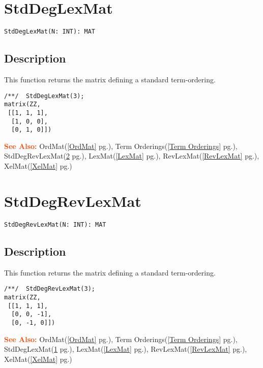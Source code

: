 \documentclass[a4paper]{mybook}
\newenvironment{command}{}{} %
\newcommand\SeeAlso{\par\textcolor{OrangeRed}{\textbf{\large See Also: }}}
\begin{document}
\section{StdDegLexMat}
\label{StdDegLexMat}
\begin{command} %


\begin{Verbatim}[label=syntax, rulecolor=\color{MidnightBlue},
frame=single]
StdDegLexMat(N: INT): MAT
\end{Verbatim}


\subsection*{Description}

This function returns the matrix defining a standard term-ordering.
\begin{Verbatim}[label=example, rulecolor=\color{PineGreen}, frame=single]
/**/  StdDegLexMat(3);
matrix(ZZ,
 [[1, 1, 1],
  [1, 0, 0],
  [0, 1, 0]])
\end{Verbatim}


\SeeAlso %
  OrdMat(\ref{OrdMat} pg.\pageref{OrdMat}), 
    Term Orderings(\ref{Term Orderings} pg.\pageref{Term Orderings}), 
    StdDegRevLexMat(\ref{StdDegRevLexMat} pg.\pageref{StdDegRevLexMat}), 
    LexMat(\ref{LexMat} pg.\pageref{LexMat}), 
    RevLexMat(\ref{RevLexMat} pg.\pageref{RevLexMat}), 
    XelMat(\ref{XelMat} pg.\pageref{XelMat})
\end{command} %

\section{StdDegRevLexMat}
\label{StdDegRevLexMat}
\begin{command} %


\begin{Verbatim}[label=syntax, rulecolor=\color{MidnightBlue},
frame=single]
StdDegRevLexMat(N: INT): MAT
\end{Verbatim}


\subsection*{Description}

This function returns the matrix defining a standard term-ordering.
\begin{Verbatim}[label=example, rulecolor=\color{PineGreen}, frame=single]
/**/  StdDegRevLexMat(3);
matrix(ZZ,
 [[1, 1, 1],
  [0, 0, -1],
  [0, -1, 0]])
\end{Verbatim}


\SeeAlso %
  OrdMat(\ref{OrdMat} pg.\pageref{OrdMat}), 
    Term Orderings(\ref{Term Orderings} pg.\pageref{Term Orderings}), 
    StdDegLexMat(\ref{StdDegLexMat} pg.\pageref{StdDegLexMat}), 
    LexMat(\ref{LexMat} pg.\pageref{LexMat}), 
    RevLexMat(\ref{RevLexMat} pg.\pageref{RevLexMat}), 
    XelMat(\ref{XelMat} pg.\pageref{XelMat})
\end{command} %
\end{document}
